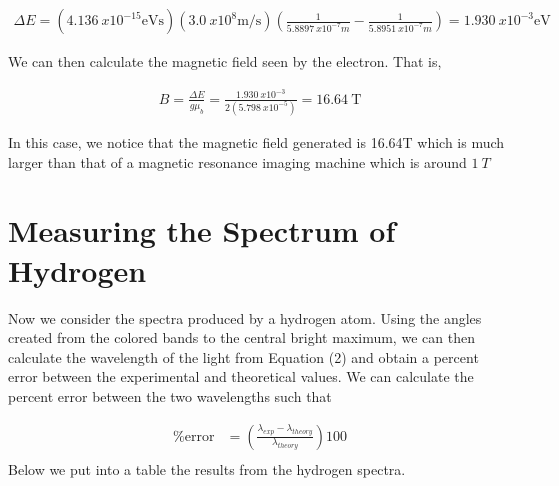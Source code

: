 \documentclass[12pt]{article}
\begin{document}
\begin{equation}
    \begin{split}
        \Delta E = (\SI{4.136}{x10^{-15} \electronvolt\second})(\SI{3.0}{x10^8 \meter\per\second})\left( \frac{1}{\SI{5.8897}{x10^{-7}m}} - \frac{1}{\SI{5.8951}{x10^{-7}m}}\right) = \SI{1.930}{x10^{-3}\electronvolt}
    \end{split}
\end{equation}

We can then calculate the magnetic field seen by the electron. That is,

\begin{equation}
    \begin{split}
        B = \frac{\Delta E}{g\mu_b} = \frac{\SI{1.930}{x10^{-3}}}{2(\SI{5.798}{x10^{-5}})} = \SI{16.64}{\tesla}
    \end{split}
\end{equation}

In this case, we notice that the magnetic field generated is 16.64T which is much larger than that of a magnetic resonance imaging machine which is around $\SI{1}{T}$

\section{Measuring the Spectrum of Hydrogen}
Now we consider the spectra produced by a hydrogen atom. Using the angles created from the colored bands to the central bright maximum, we can then calculate the wavelength of the light from Equation (2) and obtain a percent error between the experimental and theoretical values. We can calculate the percent error between the two wavelengths such that

\begin{equation}
    \begin{split}
        \text{\% error} &= \left( \frac{\lambda_{exp} - \lambda_{theory}}{\lambda_{theory}} \right) 100 \\
    \end{split}
\end{equation}
Below we put into a table the results from the hydrogen spectra.

\setlength{\tabcolsep}{1pt}
\renewcommand{\arraystretch}{1.25}
\end{document}
